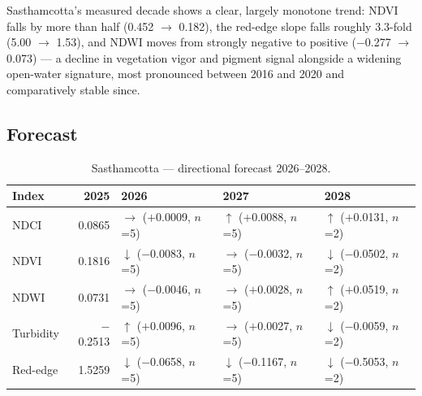 \documentclass[12pt,a4paper,oneside]{report}
\begin{document}
Sasthamcotta's measured decade shows a clear, largely monotone
trend: NDVI falls by more than half (0.452 $\to$ 0.182), the
red-edge slope falls roughly 3.3-fold (5.00 $\to$ 1.53), and NDWI
moves from strongly negative to positive ($-$0.277 $\to$ 0.073) ---
a decline in vegetation vigor and pigment signal alongside a
widening open-water signature, most pronounced between 2016 and 2020
and comparatively stable since.

\subsection{Forecast}

\begin{table}[H]
\centering
\caption{Sasthamcotta --- directional forecast 2026--2028.}
\label{tab:sasthamcotta_fc}
\begin{tabular}{lrlll}
\toprule
Index & 2025 & 2026 & 2027 & 2028 \\
\midrule
NDCI & 0.0865 & $\rightarrow$ ($+$0.0009, $n$=5) & $\uparrow$ ($+$0.0088, $n$=5) & $\uparrow$ ($+$0.0131, $n$=2) \\
NDVI & 0.1816 & $\downarrow$ ($-$0.0083, $n$=5) & $\rightarrow$ ($-$0.0032, $n$=5) & $\downarrow$ ($-$0.0502, $n$=2) \\
NDWI & 0.0731 & $\rightarrow$ ($-$0.0046, $n$=5) & $\rightarrow$ ($+$0.0028, $n$=5) & $\uparrow$ ($+$0.0519, $n$=2) \\
Turbidity & $-$0.2513 & $\uparrow$ ($+$0.0096, $n$=5) & $\rightarrow$ ($+$0.0027, $n$=5) & $\downarrow$ ($-$0.0059, $n$=2) \\
Red-edge & 1.5259 & $\downarrow$ ($-$0.0658, $n$=5) & $\downarrow$ ($-$0.1167, $n$=5) & $\downarrow$ ($-$0.5053, $n$=2) \\
\bottomrule
\end{tabular}
\end{table}
\end{document}
